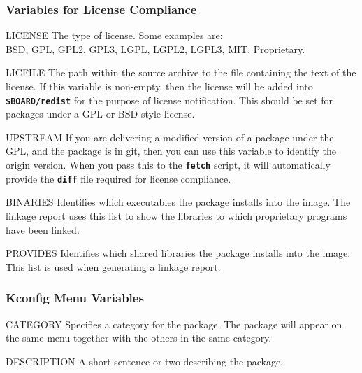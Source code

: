 \documentclass[a4paper,10pt]{article}
\newenvironment{Description}[1][\quad]{%
  \begin{list}{}{%
      \renewcommand{\makelabel}[1]{\textbf{##1}\hfill}%
      \settowidth{\labelwidth}{\textbf{#1}}%
      \setlength{\leftmargin}{\labelwidth+\labelsep}%
  }%
}{%
  \end{list}%
}
\newcommand{\fw}{\tt\bf}
\begin{document}
\subsubsection{Variables for License Compliance}

    \begin{Description}[UPSTREAMXX]
    \item[LICENSE]
      The type of license. Some examples are: \\
      BSD, GPL, GPL2, GPL3, LGPL, LGPL2, LGPL3, MIT, Proprietary.

    \item[LICFILE]
      The path within the source archive to the file containing the
      text of the license. If this variable is non-empty, then the
      license will be added into {\fw \$BOARD/redist} for the purpose
      of license notification. This should be set for packages under a
      GPL or BSD style license.

    \item[UPSTREAM]
      If you are delivering a modified version of a package under the
      GPL, and the package is in git, then you can use this variable
      to identify the origin version. When you pass this to the
      {\fw fetch} script, it will automatically provide the {\fw diff}
      file required for license compliance.

    \item[BINARIES]
      Identifies which executables the package installs into the
      image. The linkage report uses this list to show the libraries
      to which proprietary programs have been linked.

    \item[PROVIDES]
      Identifies which shared libraries the package installs into the
      image. This list is used when generating a linkage report.

    \end{Description}

\subsubsection{Kconfig Menu Variables}

    \begin{Description}[DESCRIPTIONXXX]
    \item[CATEGORY]
      Specifies a category for the package. The package will appear on
      the same menu together with the others in the same category.
    \item[DESCRIPTION]
      A short sentence or two describing the package.
    \end{Description}
\end{document}
